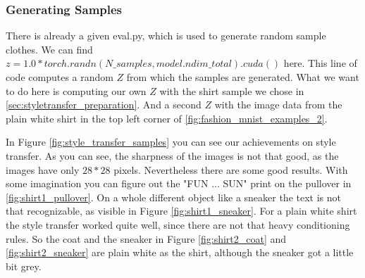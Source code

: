 \documentclass[final]{cvpr}
\begin{document}
\subsubsection{Generating Samples}
There is already a given eval.py, which is used to generate random sample clothes. We can find 
$z = 1.0 * torch.randn(N\_samples, model.ndim\_total).cuda()$ here. This line of code computes a random $Z$ from which the samples are generated. What we want to do here is computing our own $Z$ with the shirt sample we chose in \ref{sec:styletransfer_preparation}. And a second $Z$ with the image data from the plain white shirt in the top left corner of \ref{fig:fashion_mnist_examples_2}.

In Figure \ref{fig:style_transfer_samples} you can see our achievements on style transfer. As you can see, the sharpness of the images is not that good, as the images have only $28 * 28$ pixels. Nevertheless there are some good results. With some imagination you can figure out the "FUN ... SUN" print on the pullover in \ref{fig:shirt1_pullover}. On a whole different object like a sneaker the text is not that recognizable, as visible in Figure \ref{fig:shirt1_sneaker}. For a plain white shirt the style transfer worked quite well, since there are not that heavy conditioning rules. So the coat and the sneaker in Figure \ref{fig:shirt2_coat} and \ref{fig:shirt2_sneaker} are plain white as the shirt, although the sneaker got a little bit grey.
\end{document}
